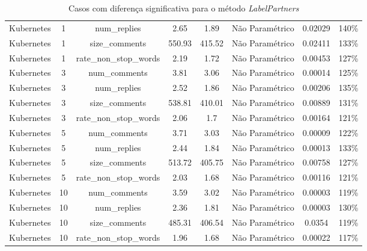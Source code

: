 \documentclass[12pt,openany,oneside,a4paper,english,brazil]{abntbibufjf}
\begin{document}
\begin{table}[htbp]
{\begin{tabular}{|c|c|c|c|c|c|c|c|}
Kubernetes & 1  & num\_replies           & 2.65               & 1.89                   & Não Paramétrico & 0.02029 & 140\%     \\
Kubernetes & 1  & size\_comments         & 550.93             & 415.52                 & Não Paramétrico & 0.02411 & 133\%     \\
Kubernetes & 1  & rate\_non\_stop\_words & 2.19               & 1.72                   & Não Paramétrico & 0.00453 & 127\%     \\
Kubernetes & 3  & num\_comments          & 3.81               & 3.06                   & Não Paramétrico & 0.00014 & 125\%     \\
Kubernetes & 3  & num\_replies           & 2.52               & 1.86                   & Não Paramétrico & 0.00206 & 135\%     \\
Kubernetes & 3  & size\_comments         & 538.81             & 410.01                 & Não Paramétrico & 0.00889 & 131\%     \\
Kubernetes & 3  & rate\_non\_stop\_words & 2.06               & 1.7                    & Não Paramétrico & 0.00164 & 121\%     \\
Kubernetes & 5  & num\_comments          & 3.71               & 3.03                   & Não Paramétrico & 0.00009 & 122\%     \\
Kubernetes & 5  & num\_replies           & 2.44               & 1.84                   & Não Paramétrico & 0.00013 & 133\%     \\
Kubernetes & 5  & size\_comments         & 513.72             & 405.75                 & Não Paramétrico & 0.00758 & 127\%     \\
Kubernetes & 5  & rate\_non\_stop\_words & 2.03               & 1.68                   & Não Paramétrico & 0.00116 & 121\%     \\
Kubernetes & 10 & num\_comments          & 3.59               & 3.02                   & Não Paramétrico & 0.00003 & 119\%     \\
Kubernetes & 10 & num\_replies           & 2.36               & 1.81                   & Não Paramétrico & 0.00003 & 130\%     \\
Kubernetes & 10 & size\_comments         & 485.31             & 406.54                 & Não Paramétrico & 0.0354  & 119\%     \\
Kubernetes & 10 & rate\_non\_stop\_words & 1.96               & 1.68                   & Não Paramétrico & 0.00022 & 117\%
\end{tabular}%
}
\hline
\caption{Casos com diferença significativa para o método \textit{LabelPartners}}
\label{tab:resultados-labelpartners}
\end{table}
\end{document}
